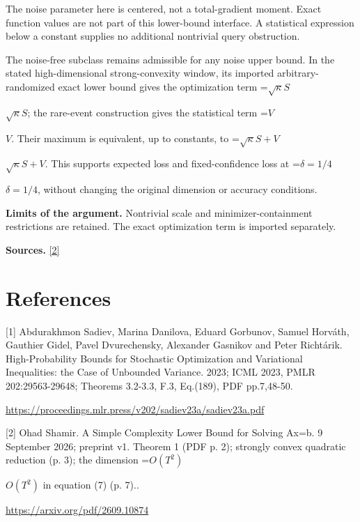 \documentclass[10pt,a4paper]{article}
\newcommand{\AtlasMath}[1]{\par\begingroup\centering\setbox0=\hbox{$\displaystyle #1$}\ifdim\wd0>1.4\linewidth\typeout{ATLAS WIDE FORMULA: \the\wd0}\fi\ifdim\wd0>\linewidth\resizebox{\linewidth}{!}{\box0}\else\box0\fi\par\endgroup}
\newcommand{\AtlasInlineMath}[1]{\begingroup\setbox0=\hbox{$#1$}\ifdim\wd0>.4\linewidth\endgroup\AtlasMath{#1}\else\endgroup$#1$\fi}
\begin{document}
The noise parameter here is centered, not a total-gradient moment. Exact function values are not part of this lower-bound interface. A statistical expression below a constant supplies no additional nontrivial query obstruction.

The noise-free subclass remains admissible for any noise upper bound. In the stated high-dimensional strong-convexity window, its imported arbitrary-randomized exact lower bound gives the optimization term \AtlasInlineMath{\sqrt\kappa S}; the rare-event construction gives the statistical term \AtlasInlineMath{V}. Their maximum is equivalent, up to constants, to \AtlasInlineMath{\sqrt\kappa S+V}. This supports expected loss and fixed-confidence loss at \AtlasInlineMath{\delta=1/4}, without changing the original dimension or accuracy conditions.

\textbf{Limits of the argument.} Nontrivial scale and minimizer-containment restrictions are retained. The exact optimization term is imported separately.

\textbf{Sources.} \href{https://arxiv.org/pdf/2609.10874}{[2]}

\section{References}
[1] Abdurakhmon Sadiev, Marina Danilova, Eduard Gorbunov, Samuel Horváth, Gauthier Gidel, Pavel Dvurechensky, Alexander Gasnikov and Peter Richtárik. High-Probability Bounds for Stochastic Optimization and Variational Inequalities: the Case of Unbounded Variance. 2023; ICML 2023, PMLR 202:29563-29648; Theorems 3.2-3.3, F.3, Eq.(189), PDF pp.7,48-50.

\url{https://proceedings.mlr.press/v202/sadiev23a/sadiev23a.pdf}

[2] Ohad Shamir. A Simple Complexity Lower Bound for Solving Ax=b. 9 September 2026; preprint v1. Theorem 1 (PDF p. 2); strongly convex quadratic reduction (p. 3); the dimension \AtlasInlineMath{O(T^2)} in equation (7) (p. 7)..

\url{https://arxiv.org/pdf/2609.10874}
\end{document}
